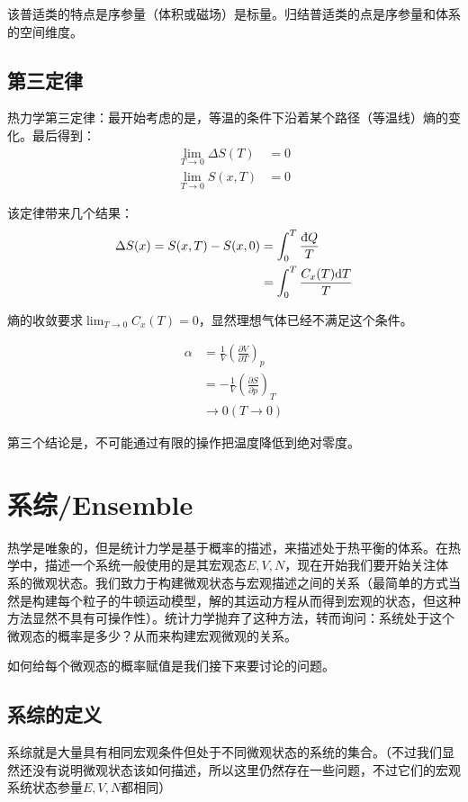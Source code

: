 \documentclass[a4paper, 10pt, openany]{book}%
\begin{document}
该普适类的特点是序参量（体积或磁场）是标量。归结普适类的点是序参量和体系的空间维度。

\section{第三定律}

热力学第三定律：最开始考虑的是，等温的条件下沿着某个路径（等温线）熵的变化。最后得到：
\begin{align}
\lim_{T\to 0} \Delta S(T)&=0\\
\lim_{T\to 0}  S(x,T)&=0
\end{align}

该定律带来几个结果：
\begin{align}
\Delta S(x)=S(x,T)-S(x,0)&=\int_0^T\frac{\text{\dj}Q}{T}\\
&=\int_0^T\frac{C_x(T)\mathrm{d}T}{T}
\end{align}

熵的收敛要求$\lim_{T\to 0}C_x(T)=0$，显然理想气体已经不满足这个条件。

\begin{align}
\alpha&=\frac{1}{V}\left(\frac{\partial V}{\partial T}\right)_p\\
&=-\frac{1}{V}\left(\frac{\partial S}{\partial p}\right)_T\\
&\to 0(T \to 0)
\end{align}

第三个结论是，不可能通过有限的操作把温度降低到绝对零度。


\chapter{系综/Ensemble}

热学是唯象的，但是统计力学是基于概率的描述，来描述处于热平衡的体系。在热学中，描述一个系统一般使用的是其宏观态$E,V,N$，现在开始我们要开始关注体系的微观状态。我们致力于构建微观状态与宏观描述之间的关系（最简单的方式当然是构建每个粒子的牛顿运动模型，解的其运动方程从而得到宏观的状态，但这种方法显然不具有可操作性）。统计力学抛弃了这种方法，转而询问：系统处于这个微观态的概率是多少？从而来构建宏观微观的关系。

如何给每个微观态的概率赋值是我们接下来要讨论的问题。

\section{系综的定义}
系综就是大量具有相同宏观条件但处于不同微观状态的系统的集合。（不过我们显然还没有说明微观状态该如何描述，所以这里仍然存在一些问题，不过它们的宏观系统状态参量$E,V,N$都相同）
\end{document}
